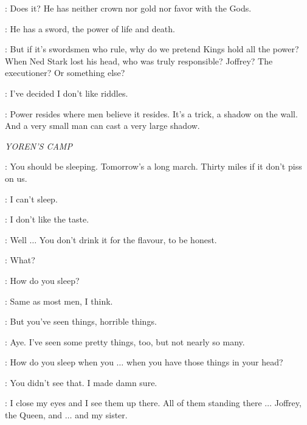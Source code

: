 \VARYS: Does it? He has neither crown nor gold nor favor with the Gods. 

\TYRION: He has a sword, the power of life and death. 

\VARYS: But if it's swordsmen who rule, why do we pretend Kings hold all the power? When Ned Stark lost his head, who was truly responsible? Joffrey? The executioner? Or something else? 

\TYRION: I've decided I don't like riddles. 

\VARYS: Power resides where men believe it resides. It's a trick, a shadow on the wall. And a very small man can cast a very large shadow. 


\scene

\textit{YOREN'S CAMP} 


\YOREN: You should be sleeping. Tomorrow's a long march. Thirty miles if it don't piss on us. 

\ARYA: I can't sleep. 


\ARYA: I don't like the taste. 

\YOREN: Well $\ldots$ You don't drink it for the flavour, to be honest. 


\YOREN: What? 

\ARYA: How do you sleep? 

\YOREN: Same as most men, I think. 

\ARYA: But you've seen things, horrible things. 

\YOREN: Aye. I've seen some pretty things, too, but not nearly so many. 

\ARYA: How do you sleep when you $\ldots$ when you have those things in your head? 

\YOREN: You didn't see that. I made damn sure. 

\ARYA: I close my eyes and I see them up there. All of them standing there $\ldots$ Joffrey, the Queen, and $\ldots$ and my sister. 

